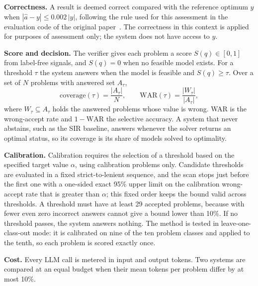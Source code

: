 \documentclass[conference]{IEEEtran}
\begin{document}
\textbf{Correctness.} A result is deemed correct compared with the reference optimum $y$ when
$|\hat{a} - y| \le 0.002\,|y|$, following the rule used for this assessment in the evaluation code of the original
paper~\cite{chen2026optengine}. The correctness in this context is applied for purposes of assessment only; the system
does not have access to $y$.

\textbf{Score and decision.} The verifier gives each problem a score $S(q) \in [0, 1]$ from label-free signals, and
$S(q) = 0$ when no feasible model exists. For a threshold $\tau$ the system answers when the model is feasible and
$S(q) \ge \tau$. Over a set of $N$ problems with answered set $A_\tau$,
\begin{equation}
\mathrm{coverage}(\tau) = \frac{|A_\tau|}{N}, \qquad
\mathrm{WAR}(\tau) = \frac{|W_\tau|}{|A_\tau|},
\end{equation}
where $W_\tau \subseteq A_\tau$ holds the answered problems whose value is wrong. WAR is the wrong-accept rate and
$1 - \mathrm{WAR}$ the selective accuracy. A system that never abstains, such
as the SIR baseline, answers whenever the solver returns an optimal status, so its coverage is its share of models
solved to optimality.

\textbf{Calibration.} Calibration requires the selection of a threshold based on the specified target value
$\alpha$, using calibration problems only. Candidate thresholds are evaluated in a fixed strict-to-lenient sequence,
and the scan stops just before the first one with a one-sided exact 95\% upper limit on the calibration wrong-accept
rate that is greater than $\alpha$; this fixed order keeps the bound valid across thresholds. A threshold must have at
least 29 accepted problems, because with fewer even zero incorrect answers cannot give a bound lower than 10\%. If no
threshold passes, the system answers nothing. The method is tested in leave-one-class-out mode: it is calibrated on
nine of the ten problem classes and applied to the tenth, so each problem is scored exactly once.

\textbf{Cost.} Every LLM call is metered in input and output tokens. Two systems are compared at an equal budget when
their mean tokens per problem differ by at most 10\%.
\end{document}
